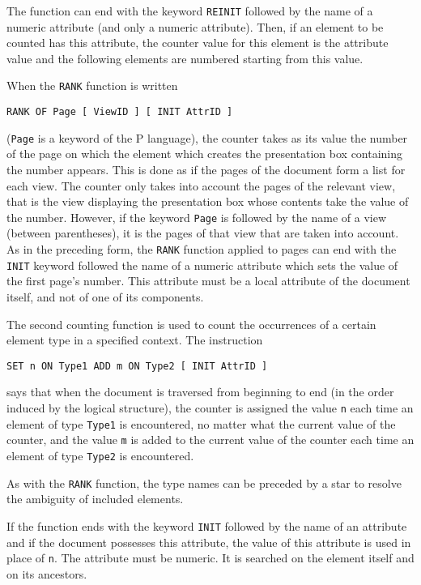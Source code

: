 The function can end with the keyword {\tt REINIT} followed by the name
of a numeric attribute (and only a numeric attribute).  Then, if an
element to be counted has this attribute, the counter value for this
element is the attribute value and the following elements are numbered
starting from this value.

When the {\tt RANK} function is written
\begin{verbatim}
RANK OF Page [ ViewID ] [ INIT AttrID ]
\end{verbatim}
({\tt Page} is a keyword of the P language), the counter takes as its
value the number of the page on which the element which creates the
presentation box containing the number appears.  This is done as if
the pages of the document form a list for each view.  The counter only
takes into account the pages of the relevant view, that is the view
displaying the presentation box whose contents take the value of the
number.  However, if the keyword {\tt Page} is followed by the name of a
view (between parentheses), it is the pages of that view that are
taken into account.  As in the preceding form, the {\tt RANK} function
applied to pages can end with the {\tt INIT} keyword followed the name
of a numeric attribute which sets the value of the first page's
number.  This attribute must be a local attribute of the document
itself, and not of one of its components.

The second counting function is used to count the occurrences of a
certain element type in a specified context.  The instruction
\begin{verbatim}
SET n ON Type1 ADD m ON Type2 [ INIT AttrID ]
\end{verbatim}
says that when the document is traversed from beginning to end (in the
order induced by the logical structure), the counter is assigned the
value {\tt n} each time an element of type {\tt Type1} is encountered, no
matter what the current value of the counter, and the value {\tt m} is
added to the current value of the counter each time an element of type
{\tt Type2} is encountered.

As with the {\tt RANK} function, the type names can be preceded by a
star to resolve the ambiguity of included elements.

If the function ends with the keyword {\tt INIT} followed by the name
of an attribute and if the document possesses this attribute, the
value of this attribute is used in place of {\tt n}.  The attribute
must be numeric.  It is searched on the element itself and on its ancestors.

